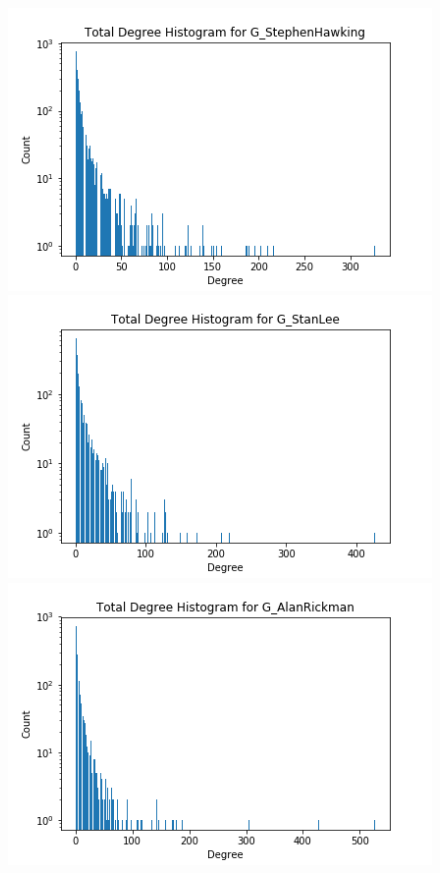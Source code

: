 \documentclass[conference]{IEEEtran}
\begin{document}
\begin{figure}[!htb]

  \includegraphics[width=\linewidth]{degreeSH.png}
\endminipage\hfill
{}
  \includegraphics[width=\linewidth]{degreeSL.png}
\endminipage\hfill
{}%
  \includegraphics[width=\linewidth]{degreeAR.png}
\endminipage


\end{figure}
\end{document}
